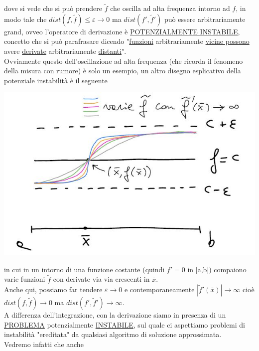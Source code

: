 \documentclass[12pt,a4paper]{article}
\begin{document}
dove si vede che si può prendere $\tilde{f}$ che oscilla ad alta frequenza intorno ad $f$, in modo tale che $dist(f,\tilde{f})\leq\varepsilon\rightarrow0$ ma $dist(f',\tilde{f}')$ può essere arbitrariamente grand, ovveo l'operatore di derivazione è \underline{POTENZIALMENTE INSTABILE}, concetto che si può parafrasare dicendo "\underline{funzioni} arbitrariamente \underline{vicine possono} avere \underline{derivate} arbitrariamente \underline{distanti}".\\Ovviamente questo dell'oscillazione ad alta frequenza (che ricorda il fenomeno della misura con
rumore) è solo un esempio, un altro disegno esplicativo della potenziale instabilità è il seguente 
\begin{center}
    \includegraphics[scale=0.5]{calcolo2.JPG}
\end{center}
in cui in un intorno di una funzione costante (quindi $f'=0$ in [a,b]) compaiono varie funzioni $\tilde{f}$ con derivate via via crescenti in $\bar{x}$.\\
Anche qui, possiamo far tendere $\varepsilon\rightarrow0$ e contemporaneamente $|\tilde{f}'(\bar{x})|\rightarrow\infty$ cioè $dist(f,\tilde{f})\rightarrow0$ ma $dist(f',\tilde{f}')\rightarrow\infty$.\\A differenza dell'integrazione, con la derivazione siamo in presenza di un \underline{PROBLEMA} potenzialmente \underline{INSTABILE}, sul quale ci aspettiamo problemi di instabilità "ereditata" da qualsiasi algoritmo di soluzione approssimata.\\Vedremo infatti che anche
\end{document}
